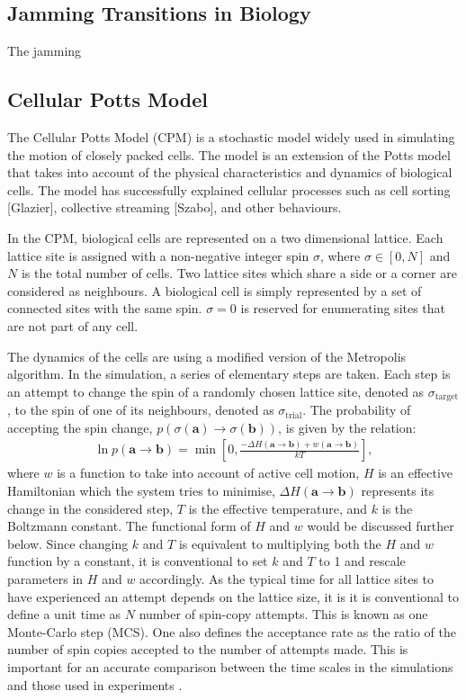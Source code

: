 \documentclass[a4paper,12pt]{article}
\newcommand{\inc}{\Delta}
\begin{document}
\subsection{Jamming Transitions in Biology}

The jamming\cite{bimotility-driven2015}

\subsection{Cellular Potts Model}


The Cellular Potts Model (CPM) is a stochastic model widely used in simulating the motion of closely packed cells. The model is an extension of the Potts model that takes into account of the physical characteristics and dynamics of biological cells. The model has successfully explained cellular processes such as cell sorting [Glazier], collective streaming [Szabo], and other behaviours.

In the CPM, biological cells are represented on a two dimensional lattice. Each lattice site is assigned with a non-negative integer spin $\sigma$, where $\sigma \in [0,N]$ and $N$ is the total number of cells. Two lattice sites which share a side or a corner are considered as neighbours. A biological cell is simply represented by a set of connected sites with the same spin. $\sigma = 0$ is reserved for enumerating sites that are not part of any cell.


The dynamics of the cells are using a modified version of the Metropolis algorithm. In the simulation, a series of elementary steps are taken. Each step is an attempt to change the spin of a randomly chosen lattice site, denoted as $\sigma_{\textrm{target}}$, to the spin of one of its neighbours, denoted as $\sigma_{\textrm{trial}}$. The probability of accepting the spin change, $p\left(\sigma(\bm{a}) \rightarrow \sigma(\bm{b})\right)$, is given by the relation:
\begin{eqnarray}
\label{eqn:prob}
\ln p (\bm{a} \rightarrow \bm{b}) = \min \left[0, \frac{-\inc H (\bm{a} \rightarrow \bm{b}) + w (\bm{a} \rightarrow \bm{b})}{kT} \right],
\end{eqnarray}
where $w$ is a function to take into account of active cell motion, $H$ is an effective Hamiltonian which the system tries to minimise,  $\inc H (\bm{a} \rightarrow \bm{b})$ represents its change in the considered step, $T$ is the effective temperature, and $k$ is the Boltzmann constant. The functional form of $H$ and $w$ would be discussed further below. Since changing $k$ and $T$ is equivalent to multiplying both the $H$ and $w$ function by a constant, it is conventional to set $k$ and $T$ to 1 and rescale parameters in $H$ and $w$ accordingly. As the typical time for all lattice sites to have experienced an attempt depends on the lattice size, it is it is conventional to define a unit time as $N$ number of spin-copy attempts. This is known as one Monte-Carlo step (MCS). One also defines the acceptance rate as the ratio of the number of spin copies accepted to the number of attempts made. This is important for an accurate comparison between the time scales in the simulations and those used in experiments \cite{sanz2010}.
 
\end{document}
